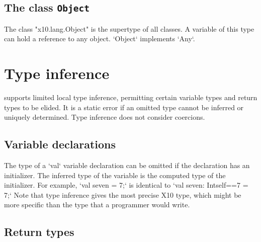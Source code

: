 {\subsection{The class {\tt Object}}
\label{Object}

The class \xcd"x10.lang.Object" is the supertype of all classes.
A variable of this type can hold a reference to any object.
\xcd`Object` implements \xcd`Any`.



\section{Type inference}
\label{TypeInference}

\XtenCurrVer{} supports limited local type inference, permitting
certain variable types and return types to be elided.
It is a static error if an omitted type cannot be inferred or
uniquely determined. Type inference does not consider coercions.

\subsection{Variable declarations}

The type of a \xcd`val` variable declaration can be omitted if the
declaration has an initializer.  The inferred type of the
variable is the computed type of the initializer.
For example, 
\xcd`val seven = 7;`
is identical to 
\xcd`val seven: Int{self==7} = 7;`
Note that type inference gives the most precise X10 type, which might be more
specific than the type that a programmer would write.




\subsection{Return types}

}
